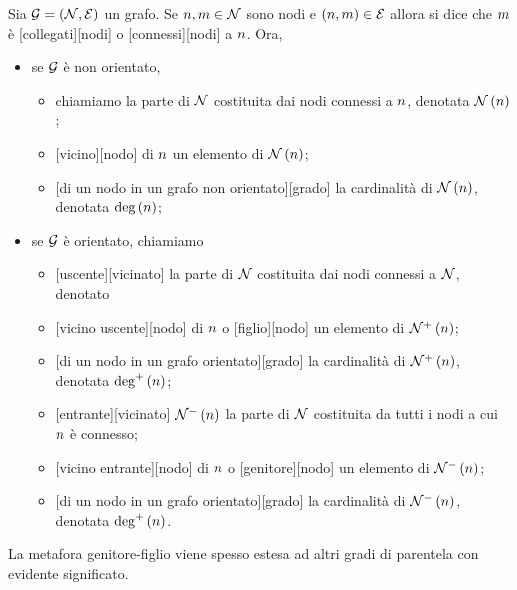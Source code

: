\begin{Definition}
	Sia $\mathcal{G} = (\mathcal{N},\mathcal{E})$ un grafo. Se
  $n, m \in \mathcal{N}$ sono nodi e $(n,m) \in \mathcal{E}$
  allora si dice che $m$ \`e [collegati][nodi]
  o [connessi][nodi] a $n$. Ora,
	\begin{itemize}
		\item se $\mathcal{G}$ \`e non orientato,
      \begin{itemize}
        \item chiamiamo  la
          parte di $\mathcal{N}$ costituita dai nodi connessi a $n$, denotata
          $\mathcal{N}\left ( n \right )$;
        \item {}[vicino][nodo] di $n$ un elemento di
          $\mathcal{N}\left ( n \right )$;
        \item {}[di un nodo in un grafo non orientato][grado] la
          cardinalit\`a di $\mathcal{N}\left ( n \right )$, denotata
          $\text{deg}\left ( n \right )$;
      \end{itemize}
		\item se $\mathcal{G}$ \`e orientato, chiamiamo
		  \begin{itemize}
			  \item {}[vicinato] la parte di
          $\mathcal{N}$ costituita dai nodi connessi a $\mathcal{N}$, denotato
        \item {}[vicino uscente][nodo] di $n$ o
          [figlio][nodo] un elemento di
          $\mathcal{N}^+\left ( n \right )$;
        \item {}[di un nodo in un grafo orientato][grado]
          la cardinalit\`a di $\mathcal{N}^+\left ( n \right )$, denotata
          $\text{deg}^+\left ( n \right )$;
	  		\item {}[entrante][vicinato]
          $\mathcal{N}^-\left ( n \right )$ la parte di $\mathcal{N}$ costituita
          da tutti i nodi a cui $n$ \`e connesso;
        \item {}[vicino entrante][nodo] di $n$ o
          [genitore][nodo] un elemento di
          $\mathcal{N}^-\left ( n \right )$;
        \item {}[di un nodo in un grafo orientato][grado]
          la cardinalit\`a di $\mathcal{N}^-\left ( n \right )$, denotata
          $\text{deg}^+\left ( n \right )$.
		  \end{itemize}
	\end{itemize}
  La metafora genitore-figlio viene spesso estesa ad altri gradi di parentela
  con evidente significato.
\end{Definition}
